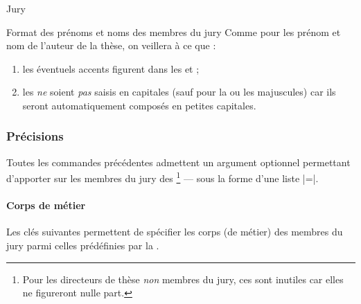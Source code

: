 \begin{dbexample}{Jury}{}
\begin{bodycode}
%
%
%
\end{bodycode}
\end{dbexample}

\begin{dbwarning}{Format des prénoms et noms des membres du jury}{}
  Comme pour les prénom et nom de l'auteur de la thèse, on veillera à ce que :
  \begin{enumerate}
  \item les éventuels accents figurent dans les  et ;
  \item les  \emph{ne} soient \emph{pas} saisis en capitales (sauf
    pour la ou les majuscules) car ils seront automatiquement composés en
    petites capitales.
  \end{enumerate}
\end{dbwarning}

\subsubsection{Précisions}\label{sec-options-staff}

Toutes les commandes précédentes admettent un argument optionnel permettant
d'apporter sur les membres du jury des \footnote{Pour les
  directeurs de thèse \emph{non} membres du jury, ces  sont
  inutiles car elles ne figureront nulle part.} --- sous la forme d'une liste
|=|.

\paragraph{Corps de métier}
\label{sec-corps}

Les clés suivantes\syntaxeoptions{} permettent de spécifier les corps (de
métier) des membres du jury parmi celles prédéfinies par la \yatcl{}.

